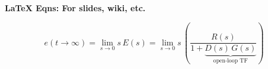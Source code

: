 \documentclass[11pt]{article}
\begin{document}
\begin{center}
  \Large{\bf{LaTeX Eqns: For slides, wiki, etc.}}
\end{center}

\[
e( t \rightarrow \infty) = \lim_{s \rightarrow 0} s \,  E(s) = \lim_{s \rightarrow 0} s \, \left( \frac{R(s)}{1 + \underbrace{D(s)\, G(s)}_{\text{open-loop TF}}}\right)
\]
\end{document}
